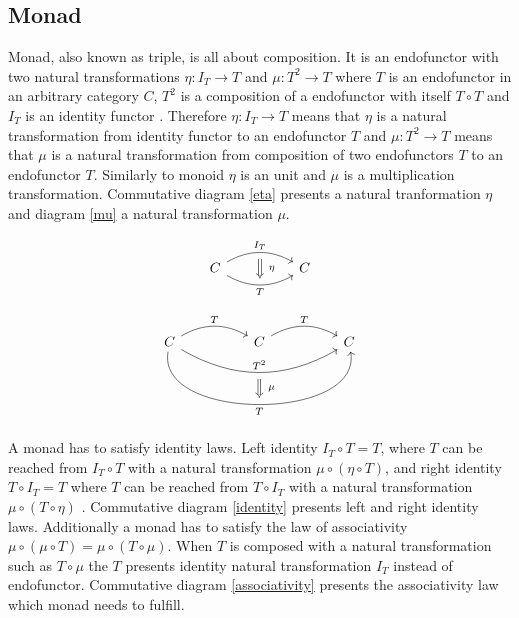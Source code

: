 \documentclass[article]{aaltoseries}
\begin{document}
  \subsection{Monad}
    Monad, also known as triple, is all about composition. It is an endofunctor
    with two natural transformations $\eta : I_T \rightarrow T$ and $\mu : T^2
    \rightarrow T$ where $T$ is an endofunctor in an arbitrary category $C$,
    $T^2$ is a composition of a endofunctor with itself $T \circ T$ and $I_T$ is
    an identity functor \cite{barr1990category, moggi1989computational}.
    Therefore $\eta : I_T \rightarrow T$ means that $\eta$ is a natural
    transformation from identity functor to an endofunctor $T$ and $\mu : T^2
    \rightarrow T$ means that $\mu$ is a natural transformation from composition
    of two endofunctors $T$ to an endofunctor $T$. Similarly to monoid $\eta$ is
    an unit and $\mu$ is a multiplication transformation. Commutative diagram
    \ref{eta} presents a natural tranformation $\eta$ and diagram \ref{mu} a natural
    transformation $\mu$.
    
    \begin{equation}
      \label{eta}
      \begin{tikzcd}[column sep=huge]
        C \arrow[r, bend left, "I_T", ""{name=A, below}]
        \arrow[r, bend right, "T"{below}, ""{name=B}]
        & C
        \arrow[Rightarrow, from=A, to=B, "\eta"{right=4}]
      \end{tikzcd}
    \end{equation}

    \begin{equation}
      \label{mu}
      \begin{tikzcd}[column sep=huge]
        C \arrow[r, bend left, "T"]
        \arrow[rr, bend right=30, "T^2", ""{name=A, below}]
        \arrow[rr, bend right=100, "T"{below}, ""{name=B}]
        & C
        \arrow[r, bend left, "T"]
        & C
        \arrow[Rightarrow, from=A, to=B, "\mu"{right=4}]
      \end{tikzcd}
    \end{equation}

    A monad has to satisfy identity laws. Left identity $I_T \circ T = T$, where
    $T$ can be reached from $I_T \circ T$ with a natural transformation
    $\mu \circ (\eta \circ T)$, and right identity $T \circ I_T = T$ where $T$
    can be reached from $T \circ I_T$ with a natural transformation $\mu \circ
    (T \circ \eta)$ \cite{mac2013categories, moggi1989computational}.
    Commutative diagram \ref{identity} presents left and right identity laws.
    Additionally a monad has to satisfy the law of associativity $\mu \circ (\mu
    \circ T) = \mu \circ (T \circ \mu)$. When $T$ is composed with a natural
    transformation such as $T \circ \mu$ the $T$ presents identity natural
    transformation $I_T$ instead of endofunctor. Commutative
    diagram \ref{associativity} presents the associativity law which monad needs
    to fulfill.
\end{document}
